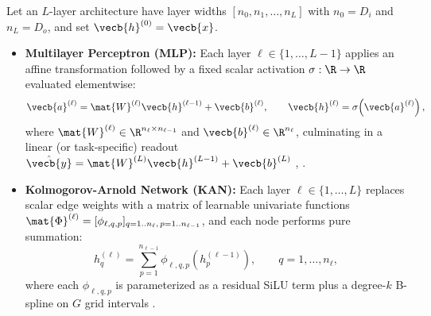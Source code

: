 \documentclass[../../../../master.tex]{subfiles}
\begin{document}
Let an $L$-layer architecture have layer widths $[n_0, n_1, \dots, n_L]$ with $n_0 = D_i$ and $n_L = D_o$, and set $\vecb{h}^{(0)} = \vecb{x}$.
\begin{itemize}
  \item \textbf{Multilayer Perceptron (MLP):} Each layer $\ell \in \{1,\dots,L-1\}$ applies an affine transformation followed by a fixed scalar activation $\sigma : \R \to \R$ evaluated elementwise:
  \begin{equation}
    \label{eq:mlpkan:mlp_layer}
    \vecb{a}^{(\ell)} = \mat{W}^{(\ell)} \vecb{h}^{(\ell-1)} + \vecb{b}^{(\ell)}, \qquad
    \vecb{h}^{(\ell)} = \sigma\!\left(\vecb{a}^{(\ell)}\right),
  \end{equation}
  where $\mat{W}^{(\ell)} \in \R^{n_\ell \times n_{\ell-1}}$ and $\vecb{b}^{(\ell)} \in \R^{n_\ell}$, culminating in a linear (or task-specific) readout $\hat{\vecb{y}} = \mat{W}^{(L)} \vecb{h}^{(L-1)} + \vecb{b}^{(L)}$ , .
  \item \textbf{Kolmogorov-Arnold Network (KAN):} Each layer $\ell \in \{1,\dots,L\}$ replaces scalar edge weights with a matrix of learnable univariate functions $\mat{\Phi}^{(\ell)} = [\phi_{\ell,q,p}]_{q=1..n_\ell,\, p=1..n_{\ell-1}}$, and each node performs pure summation:
  \begin{equation}
    \label{eq:mlpkan:kan_layer}
    h^{(\ell)}_q = \sum_{p=1}^{n_{\ell-1}} \phi_{\ell,q,p}\!\left(h^{(\ell-1)}_p\right), \qquad q = 1, \dots, n_\ell,
  \end{equation}
  where each $\phi_{\ell,q,p}$ is parameterized as a residual SiLU term plus a degree-$k$ B-spline on $G$ grid intervals .
\end{itemize}
\end{document}
